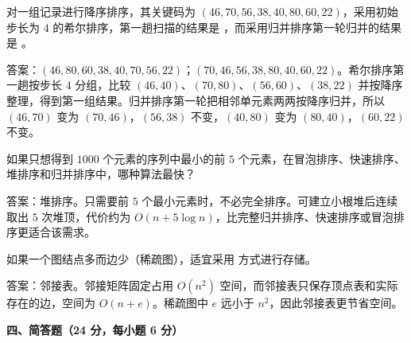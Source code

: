 \begin{question}
对一组记录进行降序排序，其关键码为 $(46,70,56,38,40,80,60,22)$，采用初始步长为 $4$ 的希尔排序，第一趟扫描的结果是 \blank，而采用归并排序第一轮归并的结果是 \blank。
\begin{solution}
答案：$(46,80,60,38,40,70,56,22)$；$(70,46,56,38,80,40,60,22)$。希尔排序第一趟按步长 $4$ 分组，比较 $(46,40)$、$(70,80)$、$(56,60)$、$(38,22)$ 并按降序整理，得到第一组结果。归并排序第一轮把相邻单元素两两按降序归并，所以 $(46,70)$ 变为 $(70,46)$，$(56,38)$ 不变，$(40,80)$ 变为 $(80,40)$，$(60,22)$ 不变。
\end{solution}
\end{question}

\begin{question}
如果只想得到 $1000$ 个元素的序列中最小的前 $5$ 个元素，在冒泡排序、快速排序、堆排序和归并排序中，哪种算法最快？\blank
\begin{solution}
答案：堆排序。只需要前 $5$ 个最小元素时，不必完全排序。可建立小根堆后连续取出 $5$ 次堆顶，代价约为 $O(n+5\log n)$，比完整归并排序、快速排序或冒泡排序更适合该需求。
\end{solution}
\end{question}

\begin{question}
如果一个图结点多而边少（稀疏图），适宜采用 \blank 方式进行存储。
\begin{solution}
答案：邻接表。邻接矩阵固定占用 $O(n^2)$ 空间，而邻接表只保存顶点表和实际存在的边，空间为 $O(n+e)$。稀疏图中 $e$ 远小于 $n^2$，因此邻接表更节省空间。
\end{solution}
\end{question}

\textbf{四、简答题（24 分，每小题 6 分）}

